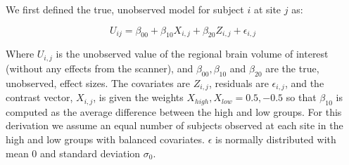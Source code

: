 We first defined the true, unobserved model for subject $i$ at site $j$ as:

\begin{equation}
U_{ij} = \beta_{00} + \beta_{10}X_{i,j} + \beta_{20}Z_{i,j} + \epsilon_{i,j}
\end{equation}

Where $U_{i,j}$ is the unobserved value of the regional brain volume of interest (without any effects from the scanner), and $\beta_{00}, \beta_{10}$ and $\beta_{20}$ are the true, unobserved, effect sizes. The covariates are $Z_{i,j}$, residuals are $\epsilon_{i,j}$, and the contrast vector, $X_{i,j}$, is given the weights $X_{high}, X_{low} = 0.5,-0.5$ so that $\beta_{10}$ is computed as the average difference between the high and low groups. For this derivation we assume an equal number of subjects observed at each site in the high and low groups with balanced covariates. $\epsilon$ is normally distributed with mean 0 and standard deviation $\sigma_0$. 